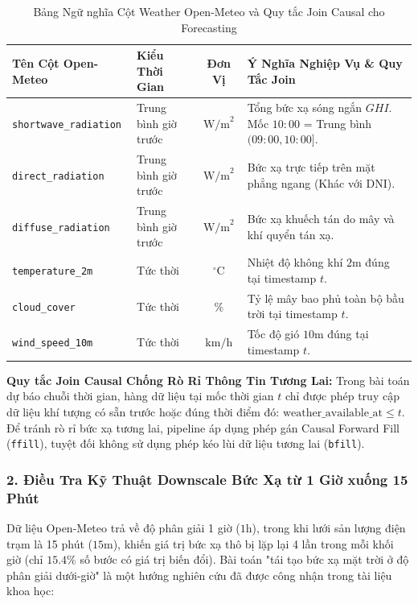 \documentclass[12pt,a4paper]{article}
\begin{document}
\begin{table}[htbp]
\centering
\caption{Bảng Ngữ nghĩa Cột Weather Open-Meteo và Quy tắc Join Causal cho Forecasting}
\label{tab:openmeteo_semantics}
\begin{tabularx}{\linewidth}{l l c X}
\toprule
\textbf{Tên Cột Open-Meteo} & \textbf{Kiểu Thời Gian} & \textbf{Đơn Vị} & \textbf{Ý Nghĩa Nghiệp Vụ \& Quy Tắc Join} \\
\midrule
\texttt{shortwave\_radiation} & Trung bình giờ trước & $\text{W/m}^2$ & Tổng bức xạ sóng ngắn $GHI$. Mốc $10:00$ = Trung bình $(09:00, 10:00]$. \\
\texttt{direct\_radiation} & Trung bình giờ trước & $\text{W/m}^2$ & Bức xạ trực tiếp trên mặt phẳng ngang (Khác với DNI). \\
\texttt{diffuse\_radiation} & Trung bình giờ trước & $\text{W/m}^2$ & Bức xạ khuếch tán do mây và khí quyển tán xạ. \\
\texttt{temperature\_2m} & Tức thời & $^\circ\text{C}$ & Nhiệt độ không khí $2\text{m}$ đúng tại timestamp $t$. \\
\texttt{cloud\_cover} & Tức thời & $\%$ & Tỷ lệ mây bao phủ toàn bộ bầu trời tại timestamp $t$. \\
\texttt{wind\_speed\_10m} & Tức thời & $\text{km/h}$ & Tốc độ gió $10\text{m}$ đúng tại timestamp $t$. \\
\bottomrule
\end{tabularx}
\end{table}

\textbf{Quy tắc Join Causal Chống Rò Rỉ Thông Tin Tương Lai:}  
Trong bài toán dự báo chuỗi thời gian, hàng dữ liệu tại mốc thời gian $t$ chỉ được phép truy cập dữ liệu khí tượng có sẵn trước hoặc đúng thời điểm đó: $\text{weather\_available\_at} \le t$. Để tránh rò rỉ bức xạ tương lai, pipeline áp dụng phép gán Causal Forward Fill (\texttt{ffill}), tuyệt đối không sử dụng phép kéo lùi dữ liệu tương lai (\texttt{bfill}).

\subsubsection{2. Điều Tra Kỹ Thuật Downscale Bức Xạ từ 1 Giờ xuống 15 Phút}
Dữ liệu Open-Meteo trả về độ phân giải 1 giờ ($1\text{h}$), trong khi lưới sản lượng điện trạm là 15 phút ($15\text{m}$), khiến giá trị bức xạ thô bị lặp lại 4 lần trong mỗi khối giờ (chỉ $15.4\%$ số bước có giá trị biến đổi). Bài toán "tái tạo bức xạ mặt trời ở độ phân giải dưới-giờ" là một hướng nghiên cứu đã được công nhận trong tài liệu khoa học:
\end{document}
